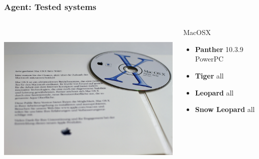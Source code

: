 \documentclass{beamer}
\begin{document}
\begin{frame}
    \frametitle{Agent: Tested systems}

 \begin{columns}
 \begin{column}{0.35\textwidth}
         \includegraphics[height=7.5cm]{./pics/os/macosx.jpg}
 \end{column}
 \begin{column}{0.65\textwidth}
    \begin{block}{MacOSX}
        \begin{itemize}
            \item \textbf{Panther} 10.3.9 PowerPC
            \item \textbf{Tiger} all 
            \item \textbf{Leopard} all
            \item \textbf{Snow Leopard} all
        \end{itemize}
    \end{block}
 \end{column}
\end{columns}

\end{frame}
\end{document}
